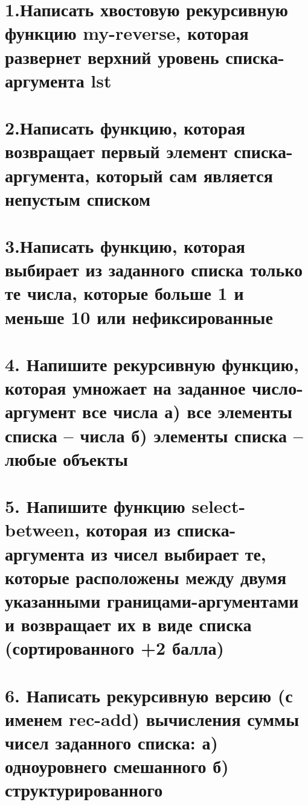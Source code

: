 \section*{1.Написать хвостовую рекурсивную функцию my-reverse, которая развернет верхний уровень списка-аргумента lst}




\section*{2.Написать функцию, которая возвращает первый элемент списка-аргумента, который сам является непустым списком}



\section*{3.Написать функцию, которая выбирает из заданного списка только те числа, которые больше 1 и меньше 10 или нефиксированные}




\section*{4. Напишите рекурсивную функцию, которая умножает на заданное число-аргумент все числа а) все элементы списка -- числа б) элементы списка -- любые объекты}




\section*{5. Напишите функцию select-between, которая из списка-аргумента из чисел выбирает те, которые расположены между двумя указанными границами-аргументами и возвращает их в виде списка (сортированного +2 балла)}




\section*{6. Написать рекурсивную версию (с именем rec-add) вычисления суммы чисел заданного списка: а) одноуровнего смешанного б) структурированного}

